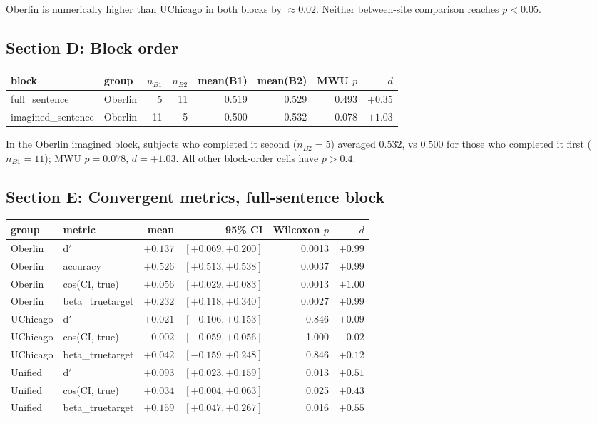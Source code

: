 \documentclass[11pt]{article}
\begin{document}
Oberlin is numerically higher than UChicago in both blocks by
$\approx 0.02$. Neither between-site comparison reaches $p < 0.05$.

\subsection{Section D: Block order}

\begin{numbersbox}
\centering\small
\begin{tabular}{llrrrrrr}
\toprule
block & group & $n_{B1}$ & $n_{B2}$ & mean(B1) & mean(B2) & MWU $p$ & $d$ \\
\midrule
full\_sentence     & Oberlin  &  5 & 11 & 0.519 & 0.529 & 0.493 & $+0.35$ \\
imagined\_sentence & Oberlin  & 11 &  5 & 0.500 & 0.532 & 0.078 & $+1.03$ \\
\bottomrule
\end{tabular}
\end{numbersbox}

In the Oberlin imagined block, subjects who completed it second
($n_{B2}=5$) averaged $0.532$, vs $0.500$ for those who completed it
first ($n_{B1}=11$); MWU $p = 0.078$, $d = +1.03$. All other
block-order cells have $p > 0.4$.

\subsection{Section E: Convergent metrics, full-sentence block}

\begin{numbersbox}
\centering\small
\begin{tabular}{llrrrr}
\toprule
group & metric & mean & 95\% CI & Wilcoxon $p$ & $d$ \\
\midrule
Oberlin  & d$'$              & $+0.137$ & $[+0.069, +0.200]$ & 0.0013 & $+0.99$ \\
Oberlin  & accuracy          & $+0.526$ & $[+0.513, +0.538]$ & 0.0037 & $+0.99$ \\
Oberlin  & cos(CI, true)     & $+0.056$ & $[+0.029, +0.083]$ & 0.0013 & $+1.00$ \\
Oberlin  & beta\_truetarget  & $+0.232$ & $[+0.118, +0.340]$ & 0.0027 & $+0.99$ \\
\midrule
UChicago & d$'$              & $+0.021$ & $[-0.106, +0.153]$ & 0.846  & $+0.09$ \\
UChicago & cos(CI, true)     & $-0.002$ & $[-0.059, +0.056]$ & 1.000  & $-0.02$ \\
UChicago & beta\_truetarget  & $+0.042$ & $[-0.159, +0.248]$ & 0.846  & $+0.12$ \\
\midrule
Unified  & d$'$              & $+0.093$ & $[+0.023, +0.159]$ & 0.013  & $+0.51$ \\
Unified  & cos(CI, true)     & $+0.034$ & $[+0.004, +0.063]$ & 0.025  & $+0.43$ \\
Unified  & beta\_truetarget  & $+0.159$ & $[+0.047, +0.267]$ & 0.016  & $+0.55$ \\
\bottomrule
\end{tabular}
\end{numbersbox}
\end{document}
